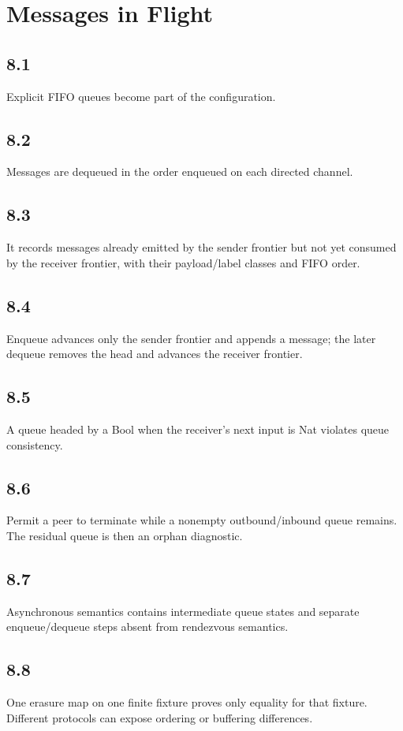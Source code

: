 \chapter{Messages in Flight}

\section*{8.1}
Explicit FIFO queues become part of the configuration.

\section*{8.2}
Messages are dequeued in the order enqueued on each directed channel.

\section*{8.3}
It records messages already emitted by the sender frontier but not yet consumed by the receiver frontier, with their payload/label classes and FIFO order.

\section*{8.4}
Enqueue advances only the sender frontier and appends a message; the later dequeue removes the head and advances the receiver frontier.

\section*{8.5}
A queue headed by a Bool when the receiver's next input is Nat violates queue consistency.

\section*{8.6}
Permit a peer to terminate while a nonempty outbound/inbound queue remains. The residual queue is then an orphan diagnostic.

\section*{8.7}
Asynchronous semantics contains intermediate queue states and separate enqueue/dequeue steps absent from rendezvous semantics.

\section*{8.8}
One erasure map on one finite fixture proves only equality for that fixture. Different protocols can expose ordering or buffering differences.

